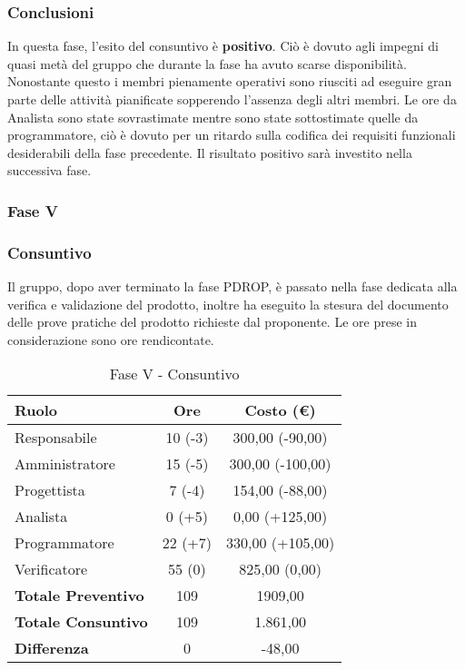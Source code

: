 \documentclass[../PianoProgetto.tex]{subfiles}
\begin{document}
	\subsubsection{Conclusioni}	
     In questa fase, l'esito del consuntivo è \textbf{positivo}. 
     Ciò è dovuto agli impegni di quasi metà del gruppo che durante la fase ha avuto scarse disponibilità. Nonostante questo i membri pienamente operativi sono riusciti ad eseguire gran parte delle attività pianificate sopperendo l'assenza degli altri membri. Le ore da Analista sono state sovrastimate mentre sono state sottostimate quelle da programmatore, ciò è dovuto per un ritardo sulla codifica dei requisiti funzionali desiderabili della fase precedente. Il risultato positivo sarà investito nella successiva fase.
     
     
     \subsubsection{Fase V}
	\subsubsection{Consuntivo}
	Il gruppo, dopo aver terminato la fase PDROP, è passato nella fase dedicata alla verifica e validazione del prodotto, inoltre ha eseguito la stesura del documento delle prove pratiche del prodotto richieste dal proponente. Le ore prese in considerazione sono ore rendicontate.
	
	\newpage
	\begin{table}[h]
		\centering
		\begin{tabular}{l * {2}{c}}
			\toprule
			\textbf{Ruolo} & \textbf{Ore} & \textbf{Costo (\euro{})} \\
			\midrule
			Responsabile &		10 (-3) & 300,00 (-90,00) \\
			Amministratore &	15 (-5) & 300,00  (-100,00) \\
			Progettista & 		7 (-4) & 154,00  (-88,00)\\
			Analista & 			0	(+5)	& 0,00   (+125,00)       \\
			Programmatore & 	22	(+7)	& 330,00 	(+105,00)			\\
			Verificatore & 		55 (0) & 825,00 (0,00)	\\
			\midrule
			\textbf{Totale Preventivo} & 109
			& 1909,00
			\\		
			\textbf{Totale Consuntivo} & 109 & 1.861,00
			\\
			\midrule
			\textbf{Differenza} & 0 & -48,00 \\
			\bottomrule
		\end{tabular}
		
		\caption{Fase V - Consuntivo}
		\label{tab:consuntivoV}
		
	\end{table}			
	
\end{document}

